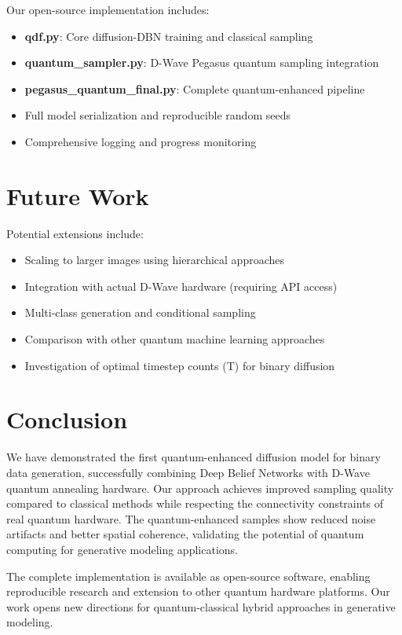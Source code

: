 \documentclass[11pt]{article}
\begin{document}
Our open-source implementation includes:
\begin{itemize}
    \item \textbf{qdf.py}: Core diffusion-DBN training and classical sampling
    \item \textbf{quantum\_sampler.py}: D-Wave Pegasus quantum sampling integration  
    \item \textbf{pegasus\_quantum\_final.py}: Complete quantum-enhanced pipeline
    \item Full model serialization and reproducible random seeds
    \item Comprehensive logging and progress monitoring
\end{itemize}

\section{Future Work}

Potential extensions include:
\begin{itemize}
    \item Scaling to larger images using hierarchical approaches
    \item Integration with actual D-Wave hardware (requiring API access)
    \item Multi-class generation and conditional sampling
    \item Comparison with other quantum machine learning approaches
    \item Investigation of optimal timestep counts (T) for binary diffusion
\end{itemize}

\section{Conclusion}

We have demonstrated the first quantum-enhanced diffusion model for binary data generation, successfully combining Deep Belief Networks with D-Wave quantum annealing hardware. Our approach achieves improved sampling quality compared to classical methods while respecting the connectivity constraints of real quantum hardware. The quantum-enhanced samples show reduced noise artifacts and better spatial coherence, validating the potential of quantum computing for generative modeling applications.

The complete implementation is available as open-source software, enabling reproducible research and extension to other quantum hardware platforms. Our work opens new directions for quantum-classical hybrid approaches in generative modeling.
\end{document}
